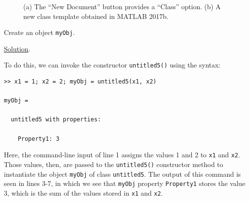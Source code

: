 \begin{figure}[htbp] %
   \centering
   \quad
   \caption{(a) The ``New Document'' button provides a ``Class'' option. (b) A new class template obtained in MATLAB 2017b.}
   \label{fig:EditorNewClass}
\end{figure}

 \label{subsect:ConstructorUntitled5}
Create an object \texttt{myObj}.

\noindent \underline{Solution}.

To do this, we can invoke the constructor \texttt{untitled5()} using the syntax:
\begin{lstlisting}[style=Matlab-editor, caption={MATLAB Command Window input utilizing and testing the \texttt{untitled5} class definition of Fig.\ \ref{fig:EditorNewClass}.}]
>> x1 = 1; x2 = 2; myObj = untitled5(x1, x2)

myObj = 

  untitled5 with properties:

    Property1: 3
\end{lstlisting}
Here, the command-line input of line 1 assigns the values 1 and 2 to \texttt{x1} and \texttt{x2}. Those values, then, are passed to the \texttt{untitled5()} constructor method to instantiate the object \texttt{myObj} of class \texttt{untitled5}. The output of this command is seen in lines 3-7, in which we see that \texttt{myObj} property \texttt{Property1} stores the value 3, which is the sum of the values stored in \texttt{x1} and \texttt{x2}.

